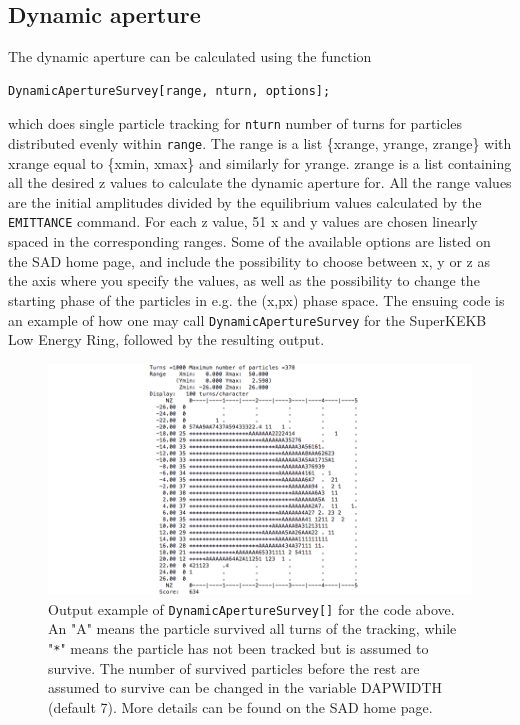 \documentclass{article}
\begin{document}
\subsection{Dynamic aperture}
The dynamic aperture can be calculated using the function
\begin{lstlisting}
DynamicApertureSurvey[range, nturn, options];
\end{lstlisting}
which does single particle tracking for \texttt{nturn} number of turns for particles distributed evenly within \texttt{range}.
The range is a list \{xrange, yrange, zrange\} with xrange equal to \{xmin, xmax\} and similarly for yrange. zrange is a list containing all the desired z values to calculate the dynamic aperture for. All the range values are the initial amplitudes divided by the equilibrium values calculated by the \texttt{EMITTANCE} command. For each z value, 51 x and y values are chosen linearly spaced in the corresponding ranges. Some of the available options are listed on the SAD home page, and include the possibility to choose between x, y or z as the axis where you specify the values, as well as the possibility to change the starting phase of the particles in e.g. the (x,px) phase space. The ensuing code is an example of how one may call \texttt{DynamicApertureSurvey} for the SuperKEKB Low Energy Ring, followed by the resulting output.
%

%
\begin{figure}[h]
	\begin{center}
	\includegraphics[width=1\columnwidth]{figures/dynamicApertSurveyOutput.png}
	\end{center}
	\caption{Output example of \texttt{DynamicApertureSurvey[]} for the code above. An "A" means the particle survived all turns of the tracking, while "\texttt{*}" means the particle has not been tracked but is assumed to survive. The number of survived particles before the rest are assumed to survive can be changed in the variable DAPWIDTH (default 7). More details can be found on the SAD home page.}
	\label{fig:dynamicApertSurveyOutput}
\end{figure}
\end{document}
